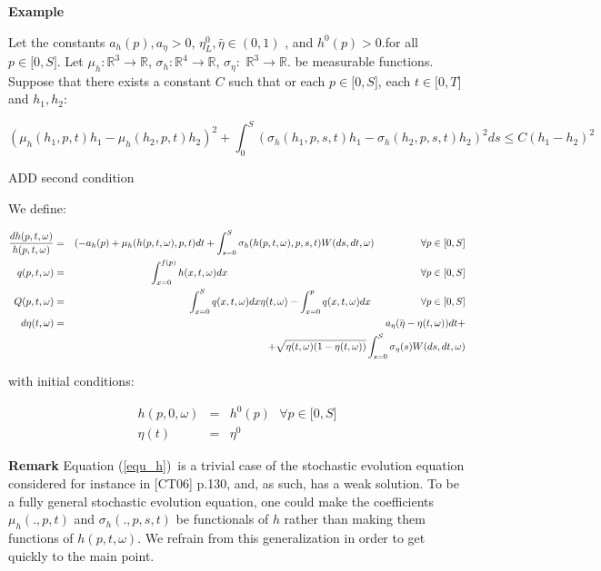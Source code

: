 \documentclass{article}
\begin{document}
\textbf{Example}

Let the constants $a_{h}(p),a_{\eta }>0$, $\eta _{L}^{0},\bar{\eta}\in (0,1)$%
, and $h^{0}(p)>0$.for all $p\in \lbrack 0,S]$. Let $\mu _{h}:\mathbb{R}%
^{3}\rightarrow \mathbb{R}$, $\sigma _{h}:\mathbb{R}^{4}\rightarrow \mathbb{R%
}$, $\sigma _{\eta }:$ $\mathbb{R}^{3}\rightarrow \mathbb{R}$. be measurable
functions. Suppose that there exists a constant $C$ such that or each $p\in
\lbrack 0,S]$, each $t\in \lbrack 0,T]$ and $h_{1},h_{2}$:

\begin{equation*}
(\mu _{h}(h_{1},p,t)h_{1}-\mu _{h}(h_{2},p,t)h_{2})^{2}+\int_{0}^{S}(\sigma
_{h}(h_{1},p,s,t)h_{1}-\sigma _{h}(h_{2},p,s,t)h_{2})^{2}ds\leq
C(h_{1}-h_{2})^{2}
\end{equation*}

ADD second condition

\bigskip

We define:

\begin{eqnarray}
\frac{dh(p,t,\omega )}{h(p,t,\omega )} &=&(-a_{h}(p)+\mu _{h}(h(p,t,\omega
),p,t)dt+\int_{s=0}^{S}\sigma _{h}(h(p,t,\omega ),p,s,t)W(ds,dt,\omega )%
\text{ \ \ \ \ \ \ \ \ \ \ \ }\forall p\in \lbrack 0,S]  \label{equ_h_A} \\
q(p,t,\omega ) &=&\int_{x=0}^{f(p)}h(x,t,\omega )dx\text{ \ \ \ \ \ \ \ \ \
\ \ \ \ \ \ \ \ \ \ \ \ \ \ \ \ \ \ \ \ \ \ \ \ \ \ \ \ \ \ \ \ \ \ \ \ \ \
\ \ \ \ \ \ \ \ }\forall p\in \lbrack 0,S]  \label{equ_q_A} \\
Q(p,t,\omega ) &=&\int_{x=0}^{S}q(x,t,\omega )dx\eta (t,\omega
)-\int_{x=0}^{p}q(x,t,\omega )dx\text{ \ \ \ \ \ \ \ \ \ \ \ \ }\forall p\in
\lbrack 0,S]  \label{equ_Q_A} \\
d\eta (t,\omega ) &=&a_{\eta }(\bar{\eta}-\eta (t,\omega ))dt+
\label{equ_eta_A} \\
&&+\sqrt{\eta (t,\omega )(1-\eta (t,\omega ))}\int_{s=0}^{S}\sigma _{\eta
}(s)W(ds,dt,\omega )
\end{eqnarray}

with initial conditions:

\begin{eqnarray}
h(p,0,\omega ) &=&h^{0}(p)\text{ \ \ \ }\forall p\in \lbrack 0,S] \\
\eta (t) &=&\eta ^{0}
\end{eqnarray}

\textbf{Remark }Equation (\ref{equ_h})\ is a trivial case of the stochastic
evolution equation considered for instance in [CT06] p.130, and, as such,
has a weak solution. To be a fully general stochastic evolution equation,
one could make the coefficients $\mu _{h}(.,p,t)$ and $\sigma _{h}(.,p,s,t)$
be functionals of $h$ rather than making them functions of $h(p,t,\omega )$.
We refrain from this generalization in order to get quickly to the main
point.
\end{document}
